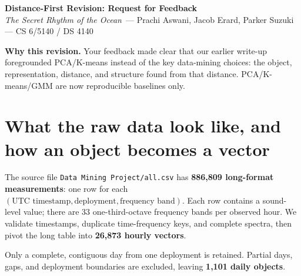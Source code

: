 \documentclass[9pt]{article}
\newcommand{\project}{\textit{The Secret Rhythm of the Ocean}}
\begin{document}
\vspace*{-10pt}
\begin{center}
{\Large\bfseries Distance-First Revision: Request for Feedback}\\[-1pt]
{\small \project\ --- Prachi Aswani, Jacob Erard, Parker Suzuki --- CS 6/5140 / DS 4140}
\end{center}
\vspace{-3pt}

\textbf{Why this revision.} Your feedback made clear that our earlier write-up
foregrounded PCA/K-means instead of the key data-mining choices: the object,
representation, distance, and structure found from that distance. PCA/K-means/GMM
are now reproducible baselines only.

\section*{What the raw data look like, and how an object becomes a vector}
The source file \texttt{Data Mining Project/all.csv} has \textbf{886,809 long-format
measurements}: one row for each \((\text{UTC timestamp},\text{deployment},\text{frequency band})\).
Each row contains a sound-level value; there are 33 one-third-octave frequency
bands per observed hour. We validate timestamps, duplicate time-frequency keys,
and complete spectra, then pivot the long table into \textbf{26,873 hourly vectors}.

\begin{center}\small
{}
\end{center}

Only a complete, contiguous day from one deployment is retained. Partial days,
gaps, and deployment boundaries are excluded, leaving \textbf{1,101 daily objects}.
\end{document}
